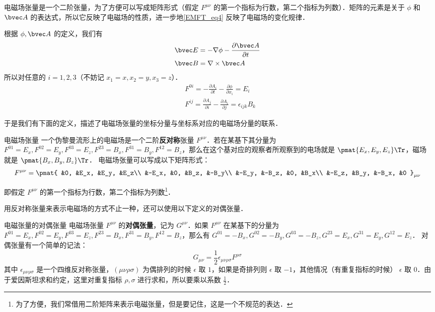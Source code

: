 电磁场张量是一个二阶张量，为了方便可以写成矩阵形式（假定 $F^{\mu\nu}$ 的第一个指标为行数，第二个指标为列数）．矩阵的元素是关于 $\phi$ 和 $\bvec A$ 的表达式，所以它反映了电磁场的性质，进一步地\autoref{EMFT_eq4} 反映了电磁场的变化规律．

根据 $\phi,\bvec A$ 的定义，我们有
\begin{equation}
\begin{aligned}
&\bvec E=-\nabla \phi-\frac{ \partial \bvec A}{\partial t}
\\
&\bvec B=\nabla\times \bvec A
\end{aligned}
\end{equation}
所以对任意的 $i=1,2,3$（不妨记 $x_1=x,x_2=y,x_3=z$）．
\begin{equation}
\begin{aligned}
&F^{0i}=-\frac{\partial A_i}{\partial t}-\frac{\partial \phi}{\partial x_i}=E_i\\
&F^{ij}=\frac{\partial A_j}{\partial i}-\frac{\partial A_i}{\partial j}=\epsilon_{ijk}B_k
\end{aligned}
\end{equation}

于是我们有下面的定义，描述了电磁场张量的坐标分量与坐标系对应的电磁场分量的联系．

\begin{definition}{电磁场张量}
一个伪黎曼流形上的电磁场是一个二阶\textbf{反对称}张量 $F^{\mu\nu}$．若在某基下其分量为 $F^{01}=E_x, F^{02}=E_y, F^{03}=E_z, F^{23}=B_x, F^{31}=B_y, F^{12}=B_z$，那么在这个基对应的观察者所观察到的电场就是 $\pmat{E_x, E_y, E_z}\Tr$，磁场就是 $\pmat{B_x, B_y, B_z}\Tr$．
电磁场张量可以写成以下矩阵形式：
\begin{equation}\label{EMFT_eq1}
F^{\mu\nu}=\pmat{
&0, &E_x, &E_y, &E_z\\
&-E_x, &0, &B_z, &-B_y\\
&-E_y, &-B_z, &0, &B_x\\
&-E_z, &B_y, &-B_x, &0
}_{\mu\nu}
\end{equation}
\end{definition}
即假定 $F^{\mu\nu}$ 的第一个指标为行数，第二个指标为列数\footnote{为了方便，我们常借用二阶矩阵来表示电磁张量，但是要记住，这是一个不规范的表达．}．

用反对称张量来表示电磁场的方式不止一种，还可以使用以下定义的对偶张量．

\begin{definition}{电磁张量的对偶张量}
电磁场张量 $F^{\mu\nu}$ 的\textbf{对偶张量}，记为 $G^{\mu\nu}$．如果 $F^{\mu\nu}$ 在某基下的分量为 $F^{01}=E_x, F^{02}=E_y, F^{03}=E_z, F^{23}=B_x, F^{31}=B_y, F^{12}=B_z$，那么有 $G^{01}=-B_x, G^{02}=-B_y, G^{03}=-B_z, G^{23}=E_x, G^{31}=E_y, G^{12}=E_z$．
对偶张量有一个简单的记法：
\begin{equation}
G_{\mu\nu}=\frac{1}{2}\epsilon_{\mu\nu\rho\sigma}F^{\rho\sigma}
\end{equation}
其中 $\epsilon_{\mu\nu\rho\sigma}$ 是一个四维反对称张量，$(\mu\nu\rho\sigma)$ 为偶排列的时候 $\epsilon$ 取 $1$，如果是奇排列则 $\epsilon$ 取 $-1$，其他情况（有重复指标的时候） $\epsilon$ 取 $0$．由于爱因斯坦求和约定，这里对重复指标 $\rho,\sigma$ 进行求和，所以要乘以系数 $\frac{1}{2}$．
\end{definition}

